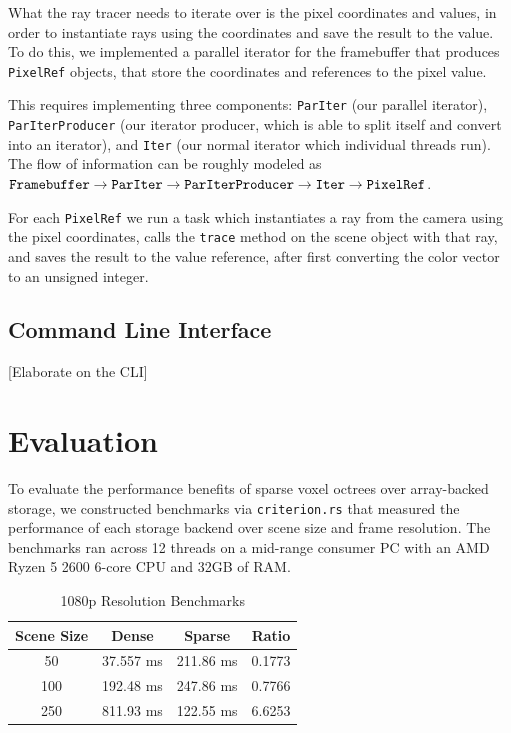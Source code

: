 \documentclass[conference]{IEEEtran}
\begin{document}
What the ray tracer needs to iterate over is the pixel coordinates and values, in order to instantiate rays using the coordinates and save the result to the value.
To do this, we implemented a parallel iterator for the framebuffer that produces \verb|PixelRef| objects, that store the coordinates and references to the pixel value.

This requires implementing three components: \verb|ParIter| (our parallel iterator), \verb|ParIterProducer| (our iterator producer, which is able to split itself and convert into an iterator), and \verb|Iter| (our normal iterator which individual threads run).
The flow of information can be roughly modeled as $\verb|Framebuffer| \to \verb|ParIter| \to \verb|ParIterProducer| \to \verb|Iter| \to \verb|PixelRef|$.

For each \verb|PixelRef| we run a task which instantiates a ray from the camera using the pixel coordinates, calls the \verb|trace| method on the scene object with that ray, and saves the result to the value reference, after first converting the color vector to an unsigned integer.

\subsection{Command Line Interface}

[Elaborate on the CLI]

\section{Evaluation}

To evaluate the performance benefits of sparse voxel octrees over array-backed storage, we constructed benchmarks via \verb|criterion.rs| that measured the performance of each storage backend over scene size and frame resolution.
The benchmarks ran across 12 threads on a mid-range consumer PC with an AMD Ryzen 5 2600 6-core CPU and 32GB of RAM.

\begin{table}[htbp]
\caption{1080p Resolution Benchmarks}
\begin{center}
\begin{tabular}{|c|c|c|c|}
\hline
\textbf{Scene Size} & \textbf{Dense} & \textbf{Sparse}  & \textbf{Ratio} \\\hline 
50 & 37.557 ms & 211.86 ms & 0.1773 \\\hline
100 & 192.48 ms & 247.86 ms & 0.7766 \\\hline
250 & 811.93 ms & 122.55 ms & 6.6253 \\\hline
\end{tabular}
\label{1080p-bench}
\end{center}
\end{table}
\end{document}
